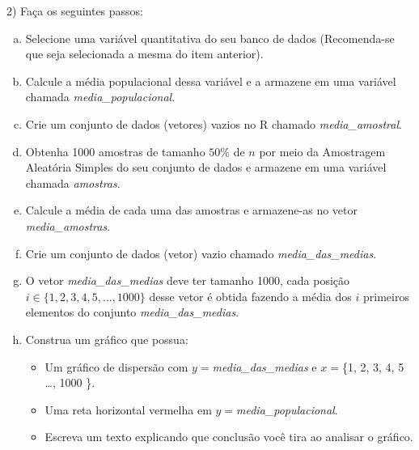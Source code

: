 \documentclass{article}
\begin{document}
2) Faça os seguintes passos:

\begin{enumerate}[a)]
    \item Selecione uma variável quantitativa do seu banco de dados (Recomenda-se que seja selecionada a mesma do item anterior). 
    \item Calcule a média populacional dessa variável e a armazene em uma variável chamada \textit{media\_populacional}.
    \item Crie um conjunto de dados (vetores) vazios no R chamado \textit{media\_amostral}.
    \item Obtenha 1000  amostras de tamanho $50\%$ de $n$ por meio da Amostragem Aleatória Simples do seu conjunto de dados e armazene em uma variável chamada \textit{amostras}. 
    \item Calcule a média de cada uma das amostras e armazene-as no vetor \textit{media\_amostras}.
    \item Crie um conjunto de dados (vetor) vazio chamado \textit{media\_das\_medias}.
    \item O vetor \textit{media\_das\_medias} deve ter tamanho 1000, cada posição $i \in \{1,2, 3, 4, 5, \dots, 1000\}$ desse vetor é obtida fazendo a média dos $i$ primeiros elementos do conjunto \textit{media\_das\_medias}. 
    \item Construa um gráfico que possua:
    \begin{itemize}
    \item Um gráfico de dispersão com $y=$\textit{media\_das\_medias} e $x=$\{1, 2, 3, 4, 5 \dots, 1000 \}.
    \item Uma reta horizontal vermelha em $y=$\textit{media\_populacional}.
    \item Escreva um texto explicando que conclusão você tira ao analisar o gráfico. 
    \end{itemize} 
\end{enumerate}
\end{document}
